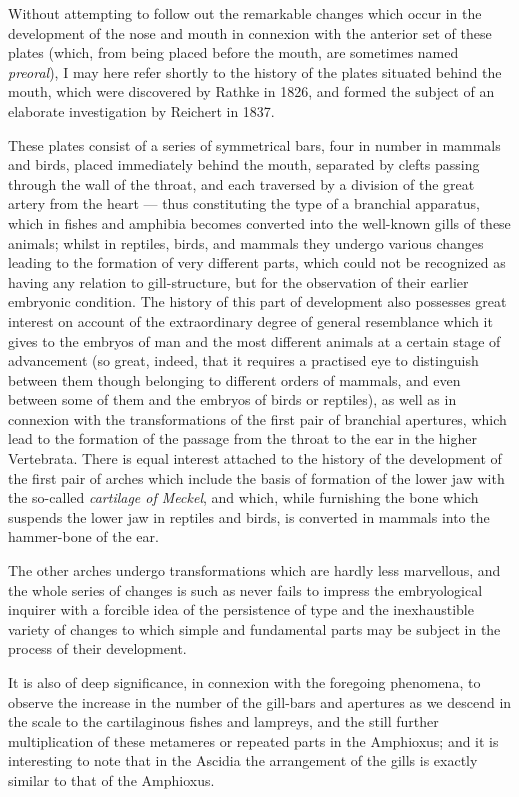 \documentclass[a4paper, 11pt, oneside, english]{article}
\begin{document}
Without attempting to follow out the remarkable changes which occur in the development of the nose and mouth in connexion with the anterior set of these plates (which, from being placed before the mouth, are sometimes named \emph{preoral}), I may here refer shortly to the history of the plates situated behind the mouth, which were discovered by Rathke in 1826, and formed the subject of an elaborate investigation by Reichert in 1837.

These plates consist of a series of symmetrical bars, four in number in mammals and birds, placed immediately behind the mouth, separated by clefts passing through the wall of the throat, and each traversed by a division of the great artery from the heart --- thus constituting the type of a branchial apparatus, which in fishes and amphibia becomes converted into the well-known gills of these animals; whilst in reptiles, birds, and mammals they undergo various changes leading to the formation of very different parts, which could not be recognized as having any relation to gill-structure, but for the observation of their earlier embryonic condition. The history of this part of development also possesses great interest on account of the extraordinary degree of general resemblance which it gives to the embryos of man and the most different animals at a certain stage of advancement (so great, indeed, that it requires a practised eye to distinguish between them though belonging to different orders of mammals, and even between some of them and the embryos of birds or reptiles), as well as in connexion with the transformations of the first pair of branchial apertures, which lead to the formation of the passage from the throat to the ear in the higher Vertebrata. There is equal interest attached to the history of the development of the first pair of arches which include the basis of formation of the lower jaw with the so-called \emph{cartilage of Meckel}, and which, while furnishing the bone which suspends the lower jaw in reptiles and birds, is converted in mammals into the hammer-bone of the ear.

The other arches undergo transformations which are hardly less marvellous, and the whole series of changes is such as never fails to impress the embryological inquirer with a forcible idea of the persistence of type and the inexhaustible variety of changes to which simple and fundamental parts may be subject in the process of their development.

It is also of deep significance, in connexion with the foregoing phenomena, to observe the increase in the number of the gill-bars and apertures as we descend in the scale to the cartilaginous fishes and lampreys, and the still further multiplication of these metameres or repeated parts in the Amphioxus; and it is interesting to note that in the Ascidia the arrangement of the gills is exactly similar to that of the Amphioxus.
\end{document}

